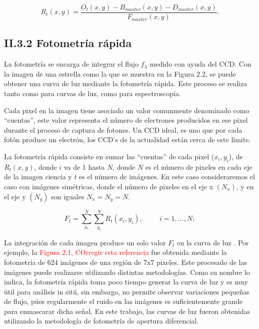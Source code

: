 \begin{equation}
  \displaystyle R_{t}(x,y) = \dfrac{O_{t}(x,y) - B_{master}(x,y) - D_{master}(x,y)}{F_{master}(x,y)}.
\end{equation}

\subsection*{II.3.2 Fotometría rápida}

La fotometría se encarga de integrar el flujo $f_{\lambda}$ medido con ayuda del CCD. Con la imagen de una estrella como la que se muestra en la Figura 2.2, se puede obtener una curva de luz mediante la fotometría rápida. Este proceso se realiza tanto como para curvas de luz, como para espectroscopía.

Cada pixel en la imagen tiene asociado un valor comunmente denominado como ``cuentas'', este valor representa el número de electrones producidos en ese pixel durante el proceso de captura de fotones. Un CCD ideal, es uno que por cada fotón produce un electrón, los CCD's de la actualidad están cerca de este límite.

La fotometría rápida consiste en sumar las ``cuentas'' de cada pixel ($x_{i},y_{i}$), de $R_{t}(x,y) $, donde $ i $ va de 1 hasta $ N $, donde $ N $ es el número de pixeles en cada eje de la imagen ciencia  y $ t $ es el número de imágenes. En este caso consideraremos el caso con imágenes simétricas, donde el número de pixeles en el eje x $(N_{x})$, y en el eje y $(N_{y})$ son iguales $N_{x}=N_{y}=N$. 

\begin{equation}
  \displaystyle F_{t} = \sum_{x_{i}}^{N} \sum_{y_{i}}^{N} R_{t}(x_{i},y_{i}),\hspace{1cm}i=1,...,N;
\end{equation}

La integración de cada imagen produce un solo valor $F_{t}$ en la curva de luz \citep{romanishin2006introduction}. Por ejemplo, la \textcolor{red}{Figura 2.1, COrregir esta referencia} fue obtenida mediante la fotometría de 624 imágenes de una región de 7x7 pixeles. Este procesado de las imágenes puede realizarse utilizando distintas metodologías. Como su nombre lo indica, la fotometría rápida toma poco tiempo generar la curva de luz y es muy útil para análisis in sitú, sin embargo, no permite observar variaciones pequeñas de flujo, púes regularmente el ruido en las imágenes es suficientemente grande para enmascarar dicha señal. En este trabajo, las curvas de luz fueron obtenidas utilizando la metodología de fotometría de apertura diferencial.

